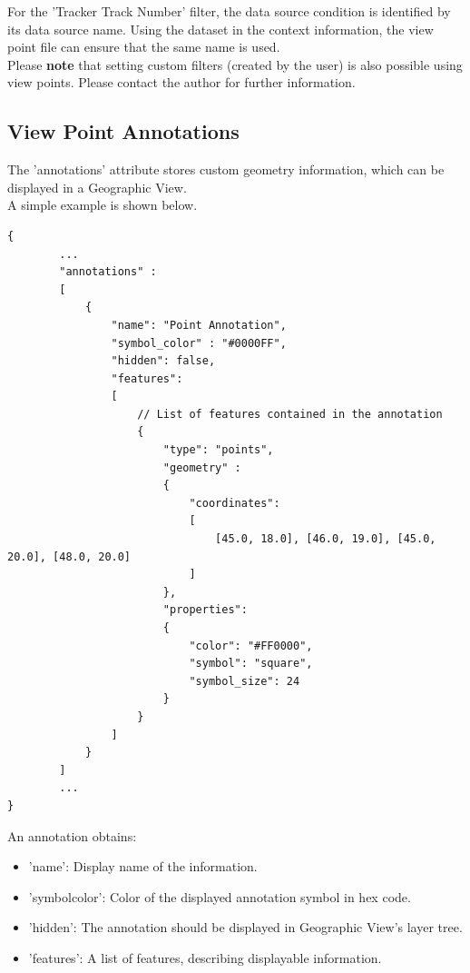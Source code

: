 For the 'Tracker Track Number' filter, the data source condition is identified by its data source name. Using the dataset in the context information, the view point file can ensure that the same name is used. \\

Please \textbf{note} that setting custom filters (created by the user) is also possible using view points. Please contact the author for further information.

\subsection{View Point Annotations}

The 'annotations' attribute stores custom geometry information, which can be displayed in a Geographic View. \\

A simple example is shown below.

\begin{lstlisting}[basicstyle=\small\ttfamily]
{
        ...
        "annotations" :
        [
            {
                "name": "Point Annotation", 
                "symbol_color" : "#0000FF",
                "hidden": false,
                "features":
                [
                    // List of features contained in the annotation 
                    {
                        "type": "points",
                        "geometry" :
                        {
                            "coordinates": 
                            [
                                [45.0, 18.0], [46.0, 19.0], [45.0, 20.0], [48.0, 20.0]
                            ]
                        },
                        "properties":
                        {
                            "color": "#FF0000",
                            "symbol": "square",
                            "symbol_size": 24
                        }
                    }    
                ]
            }
        ]
        ...
}
\end{lstlisting}

An annotation obtains: \\

\begin{itemize}
    \item 'name': Display name of the information.
    \item 'symbol\textunderscore color': Color of the displayed annotation symbol in hex code.
    \item 'hidden': The annotation should be displayed in Geographic View's layer tree.
    \item 'features': A list of features, describing displayable information. \\
\end{itemize}

